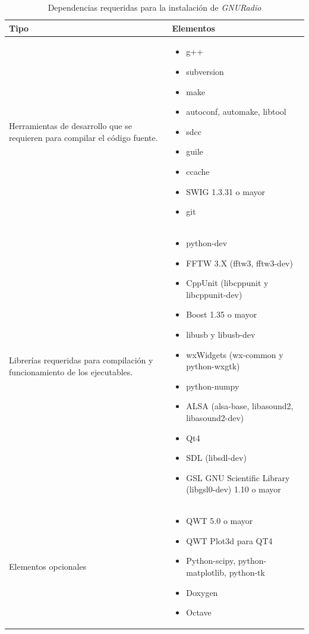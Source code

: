 \begin{table}[htp]
\begin{center}
	\begin{tabular}{|p{6cm}|p{7.5cm}|}
		\hline
		Tipo & Elementos \\
		\hline
		Herramientas de desarrollo que se requieren para compilar el c\'odigo fuente.
		& 
		\begin{itemize}
		  \item g++
		  \item subversion
		  \item make
		  \item autoconf, automake, libtool
		  \item sdcc
		  \item guile
		  \item ccache
		  \item SWIG 1.3.31 o mayor
		  \item git
		\end{itemize} \\
		\hline
		Librer\'ias requeridas para compilaci\'on y funcionamiento de los ejecutables.
		&
		\begin{itemize}
		  \item python-dev
		  \item FFTW 3.X (fftw3, fftw3-dev)
		  \item CppUnit (libcppunit y libcppunit-dev)
		  \item Boost 1.35 o mayor
		  \item libusb y libusb-dev
		  \item wxWidgets (wx-common y python-wxgtk)
		  \item python-numpy
		  \item ALSA (alsa-base, libasound2, libasound2-dev)
		  \item Qt4
		  \item SDL (libsdl-dev)
		  \item GSL GNU Scientific Library (libgsl0-dev) 1.10 o mayor
		\end{itemize}\\
		\hline
		Elementos opcionales &
		\begin{itemize}
		  \item QWT 5.0 o mayor
		  \item QWT Plot3d para QT4
		  \item Python-scipy, python-matplotlib, python-tk
		  \item Doxygen
		  \item Octave
		\end{itemize}\\
		\hline
	\end{tabular}
	\vspace{0.5in}
	\caption{Dependencias requeridas para la instalaci\'on de \emph{GNURadio}}
	\label{tbl:radioreqs}
\end{center}
\end{table}

